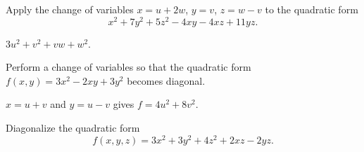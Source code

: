 \begin{ex}
  Apply the change of variables $x = u+2w$, $y = v$, $z = w-v$ to the
  quadratic form
  \begin{equation*}
    x^2 + 7y^2 + 5z^2 - 4xy - 4xz + 11yz.
  \end{equation*}
  \begin{sol}
    $3u^2 + v^2 + vw + w^2$.
  \end{sol}
\end{ex}

\begin{ex}
  Perform a change of variables so that the quadratic form
  $f(x,y) = 3x^2 - 2xy + 3y^2$ becomes diagonal.
  \begin{sol}
    $x=u+v$ and $y=u-v$ gives $f = 4u^2 + 8v^2$.
  \end{sol}
\end{ex}

\begin{ex}
  Diagonalize the quadratic form
  \begin{equation*}
    f(x,y,z) = 3x^2 + 3y^2 + 4z^2 + 2xz - 2yz.
  \end{equation*}
\end{ex}


